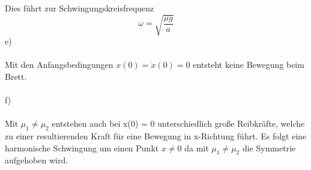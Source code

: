 Dies führt zur Schwingungskreisfrequenz
\[
	\omega = \sqrt{\frac{\mu g}{a}}
\]
e)\\ \\
Mit den Anfangsbedingungen $x(0) = \dot{x}(0) = 0$ entsteht keine Bewegung beim Brett. \\ \\
f)\\ \\
Mit $\mu_1 \neq \mu_2$ entstehen auch bei x(0) = 0 unterschiedlich große Reibkräfte, welche zu einer resultierenden Kraft für eine Bewegung in x-Richtung führt. Es folgt eine harmonische Schwingung um einen Punkt $x \neq 0$ da mit $\mu_1 \neq \mu_2$ die Symmetrie aufgehoben wird.